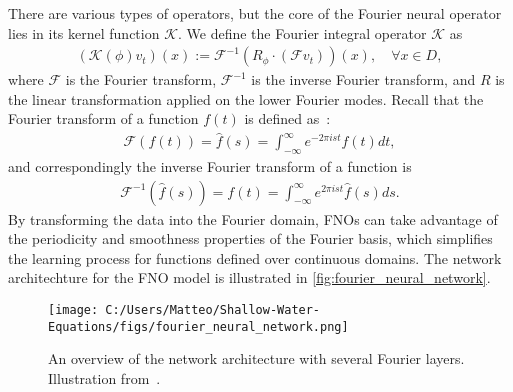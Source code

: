 There are various types of operators, but the core of the Fourier neural operator lies in its kernel function $\mathcal{K}$.
We define the Fourier integral operator $\mathcal{K}$ as 
\begin{align}
    \left( \mathcal{K}(\phi)v_t \right) (x) := \mathcal{F}^{-1} \left( R_{\phi} \cdot (\mathcal{F}v_t ) \right)(x), \quad \forall x \in D,
\end{align}
where $\mathcal{F}$ is the Fourier transform, $\mathcal{F}^{-1}$ is the inverse Fourier transform, and $R$ is the linear transformation applied on the lower Fourier modes. 
Recall that the Fourier transform of a function $f(t)$ is defined as~\cite{Fourier_Transform}:
\begin{align}
    \mathcal{F} (f(t)) = \hat{f}(s) = \int_{-\infty}^{\infty} e^{ -2 \pi ist} f(t) dt,
\end{align}
and correspondingly the inverse Fourier transform of a function is
\begin{align*}
    \mathcal{F}^{-1} (\hat{f}(s)) = f(t) = \int_{-\infty}^{\infty}  e^{2 \pi ist} \hat{f}(s) ds.
\end{align*}
By transforming the data into the Fourier domain, FNOs can take advantage of the periodicity and smoothness properties of the Fourier basis, which simplifies the learning process for functions defined over continuous domains.
The network architechture for the FNO model is illustrated in \autoref{fig:fourier_neural_network}.
\begin{figure}[H]
    \centering
    \texttt{[image: C:/Users/Matteo/Shallow-Water-Equations/figs/fourier\_neural\_network.png]}
    \caption{An overview of the network architecture with several Fourier layers. Illustration from~\cite{FNO_2021}.
            }\label{fig:fourier_neural_network}
\end{figure}
